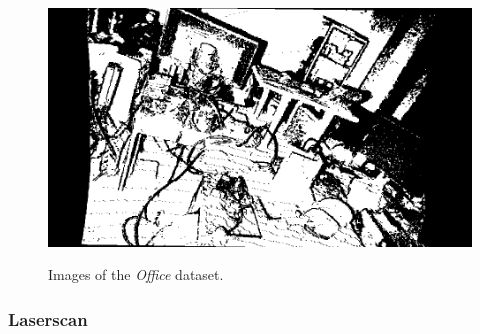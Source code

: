 \begin{figure}[H]
\begin{floatrow}
{    \includegraphics[width=0.5\linewidth]{chapter05/img/office/bearing_0024.png}%
    }
    {\caption{Images of the \emph{Office} dataset.}\label{fig:office_data}}
\end{floatrow}
\end{figure}

\subsubsection{Laserscan}

